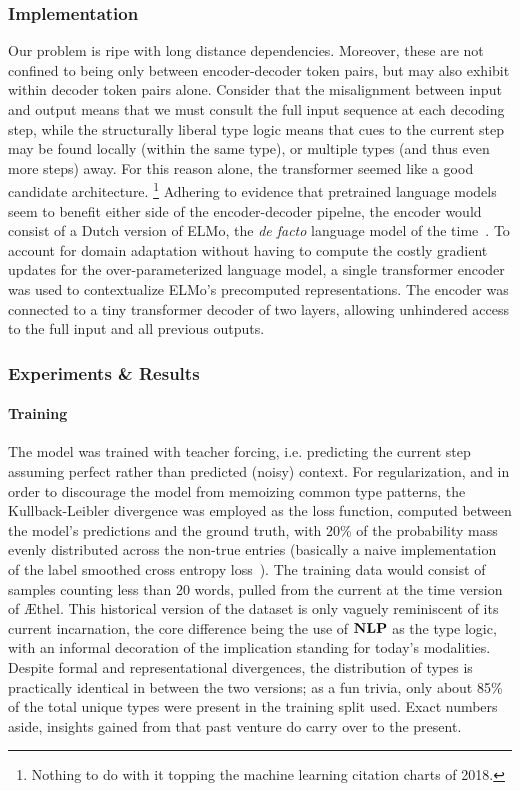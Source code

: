 \subsubsection{Implementation}
Our problem is ripe with long distance dependencies.
Moreover, these are not confined to being only between encoder-decoder token pairs, but may also exhibit within decoder token pairs alone.
Consider that the misalignment between input and output means that we must consult the full input sequence at each decoding step, while the structurally liberal type logic means that cues to the current step may be found locally (within the same type), or multiple types (and thus even more steps) away.
For this reason alone, the transformer seemed like a good candidate architecture.%
	\footnote{Nothing to do with it topping the machine learning citation charts of 2018.}
Adhering to evidence that pretrained language models seem to benefit either side of the encoder-decoder pipelne, the encoder would consist of a Dutch version of ELMo, the \textit{de facto} language model of the time~\cite{peters-etal-2018-deep,che-etal-2018-towards}.
To account for domain adaptation without having to compute the costly gradient updates for the over-parameterized language model, a single transformer encoder was used to contextualize ELMo's precomputed representations.
The encoder was connected to a tiny transformer decoder of two layers, allowing unhindered access to the full input and all previous outputs.

\subsubsection{Experiments \& Results}
\paragraph{Training}
The model was trained with teacher forcing, i.e. predicting the current step assuming perfect rather than predicted (noisy) context.
For regularization, and in order to discourage the model from memoizing common type patterns, the Kullback-Leibler divergence was employed as the loss function, computed between the model's predictions and the ground truth, with 20\% of the probability mass evenly distributed across the non-true entries (basically a naive implementation of the label smoothed cross entropy loss~\cite{szegedy2016rethinking}).
The training data would consist of samples counting less than 20 words, pulled from the current at the time version of \AE thel.
This historical version of the dataset is only vaguely reminiscent of its current incarnation, the core difference being the use of $\textbf{NLP}$ as the type logic, with an informal decoration of the implication standing for today's modalities.
Despite formal and representational divergences, the distribution of types is practically identical in between the two versions; as a fun trivia, only about 85\% of the total unique types were present in the training split used.
Exact numbers aside, insights gained from that past venture do carry over to the present.

